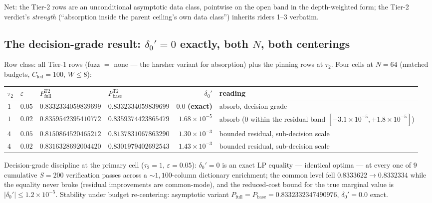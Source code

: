 \documentclass[11pt]{article}
\theoremstyle{plain}
\theoremstyle{definition}
\theoremstyle{remark}
\newcommand{\Cled}{C_{\mathrm{led}}}
\begin{document}
Net: the Tier-2 rows are an unconditional asymptotic data class, pointwise on the
open band in the depth-weighted form; the Tier-2 verdict's \emph{strength}
(``absorption inside the parent ceiling's own data class'') inherits riders 1--3
verbatim.

\subsection[The decision-grade result: delta\_0' = 0 exactly, both N, both
centerings]{The decision-grade result: $\delta_0' = 0$ exactly, both $N$, both
centerings}
\label{sec:t2result}

Row class: all Tier-1 rows (fuzz $=$ none --- the harsher variant for absorption)
plus the pinning rows at $\tau_2$. Four cells at $N = 64$ (matched budgets,
$\Cled = 100$, $W \le 8$):

\begin{table}[h]
\centering
\small
\begin{tabular}{@{}llllr >{\raggedright\arraybackslash}p{4.3cm}@{}}
\toprule
$\tau_2$ & $\varepsilon$ & $P_{\mathrm{full}}^{\mathrm{T2}}$ &
$P_{\mathrm{base}}^{\mathrm{T2}}$ & $\delta_0'$ & reading \\
\midrule
$1$ & $0.05$ & $0.8332334059839699$ & $0.8332334059839699$ &
$\mathbf{0.0}$ \textbf{(exact)} & absorb, decision grade \\
\addlinespace
$1$ & $0.02$ & $0.8359542395410772$ & $0.8359374423865479$ &
$1.68 \times 10^{-5}$ &
absorb ($0$ within the residual band
$[-3.1 \times 10^{-5}, +1.8 \times 10^{-5}]$) \\
\addlinespace
$4$ & $0.05$ & $0.8150864520465212$ & $0.8137831067863290$ &
$1.30 \times 10^{-3}$ & bounded residual, sub-decision scale \\
\addlinespace
$4$ & $0.02$ & $0.8316328692004420$ & $0.8301979402692543$ &
$1.43 \times 10^{-3}$ & bounded residual, sub-decision scale \\
\bottomrule
\end{tabular}
\end{table}

Decision-grade discipline at the primary cell ($\tau_2 = 1$,
$\varepsilon = 0.05$): $\delta_0' = 0$ is an exact LP equality --- identical
optima --- at every one of $9$ cumulative $S = 200$ verification passes across a
${\sim}1{,}100$-column dictionary enrichment; the common level fell
$0.8333622 \to 0.8332334$ while the equality never broke (residual improvements
are common-mode), and the reduced-cost bound for the true marginal value is
$|\delta_0'| \le 1.2 \times 10^{-5}$. Stability under budget re-centering:
asymptotic variant
$P_{\mathrm{full}} = P_{\mathrm{base}} = 0.8332332347490976$,
$\delta_0' = 0.0$ exact.
\end{document}
